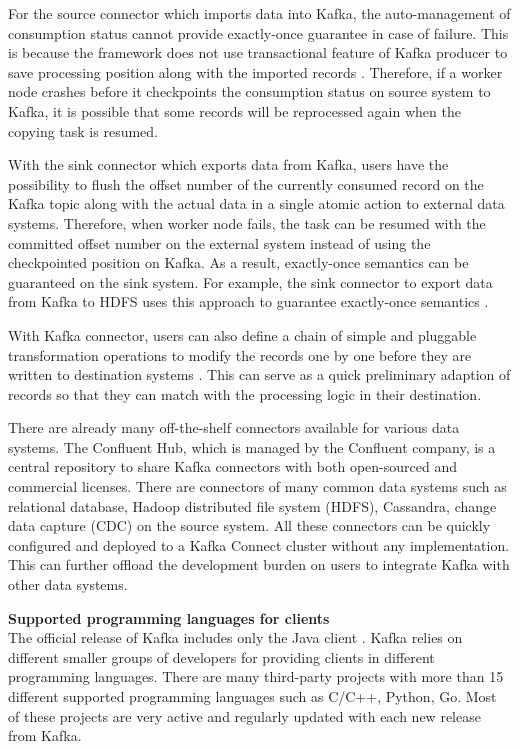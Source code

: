 For the source connector which imports data into Kafka, the auto-management of consumption status cannot provide exactly-once guarantee in case of failure. This is because the framework does not use transactional feature of Kafka producer to save processing position along with the imported records \cite{kafkaconnectsource}. Therefore, if a worker node crashes before it checkpoints the consumption status on source system to Kafka, it is possible that some records will be reprocessed again when the copying task is resumed. 

With the sink connector which exports data from Kafka, users have the possibility to flush the offset number of the currently consumed record on the Kafka topic along with the actual data in a single atomic action to external data systems. Therefore, when worker node fails, the task can be resumed with the committed offset number on the external system instead of using the checkpointed position on Kafka. As a result, exactly-once semantics can be guaranteed on the sink system. For example, the sink connector to export data from Kafka to HDFS uses this approach to guarantee exactly-once semantics \cite{kafkahdfsconnector}.


With Kafka connector, users can also define a chain of simple and pluggable transformation operations to modify the records one by one before they are written to destination systems \cite{kafkaconnect}. This can serve as a quick preliminary adaption of records so that they can match with the processing logic in their destination.

There are already many off-the-shelf connectors available for various data systems. The Confluent Hub, which is managed by the Confluent company, is a central repository to share Kafka connectors with both open-sourced and commercial licenses. There are connectors of many common data systems such as relational database, Hadoop distributed file system (HDFS), Cassandra, change data capture (CDC) on the source system. All these connectors can be quickly configured and deployed to a Kafka Connect cluster without any implementation. This can further offload the development burden on users to integrate Kafka with other data systems.

\newpage

\textbf{Supported programming languages for clients}\\
The official release of Kafka includes only the Java client \cite{kafkaclients}. Kafka relies on different smaller groups of developers for providing clients in different programming languages. There are many third-party projects with more than 15 different supported programming languages such as C/C++, Python, Go. Most of these projects are very active and regularly updated with each new release from Kafka.  

